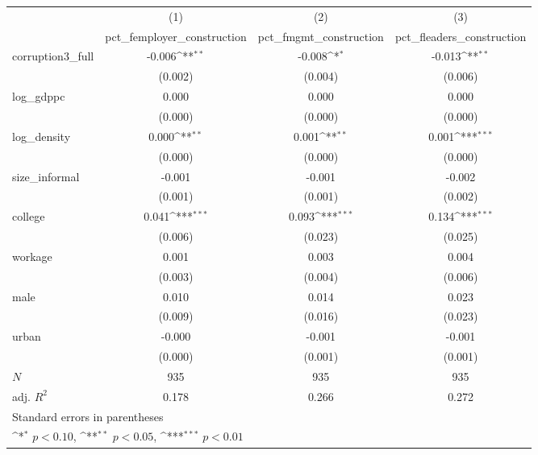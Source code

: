 {
\def\sym#1{\ifmmode^{#1}\else\(^{#1}\)\fi}
\begin{tabular}{l*{3}{c}}
\hline\hline
            &\multicolumn{1}{c}{(1)}&\multicolumn{1}{c}{(2)}&\multicolumn{1}{c}{(3)}\\
            &\multicolumn{1}{c}{pct\_femployer\_construction}&\multicolumn{1}{c}{pct\_fmgmt\_construction}&\multicolumn{1}{c}{pct\_fleaders\_construction}\\
\hline
corruption3\_full&      -0.006\sym{**} &      -0.008\sym{*}  &      -0.013\sym{**} \\
            &     (0.002)         &     (0.004)         &     (0.006)         \\
[1em]
log\_gdppc   &       0.000         &       0.000         &       0.000         \\
            &     (0.000)         &     (0.000)         &     (0.000)         \\
[1em]
log\_density &       0.000\sym{**} &       0.001\sym{**} &       0.001\sym{***}\\
            &     (0.000)         &     (0.000)         &     (0.000)         \\
[1em]
size\_informal&      -0.001         &      -0.001         &      -0.002         \\
            &     (0.001)         &     (0.001)         &     (0.002)         \\
[1em]
college     &       0.041\sym{***}&       0.093\sym{***}&       0.134\sym{***}\\
            &     (0.006)         &     (0.023)         &     (0.025)         \\
[1em]
workage     &       0.001         &       0.003         &       0.004         \\
            &     (0.003)         &     (0.004)         &     (0.006)         \\
[1em]
male        &       0.010         &       0.014         &       0.023         \\
            &     (0.009)         &     (0.016)         &     (0.023)         \\
[1em]
urban       &      -0.000         &      -0.001         &      -0.001         \\
            &     (0.000)         &     (0.001)         &     (0.001)         \\
\hline
\(N\)       &         935         &         935         &         935         \\
adj. \(R^{2}\)&       0.178         &       0.266         &       0.272         \\
\hline\hline
\multicolumn{4}{l}{\footnotesize Standard errors in parentheses}\\
\multicolumn{4}{l}{\footnotesize \sym{*} \(p<0.10\), \sym{**} \(p<0.05\), \sym{***} \(p<0.01\)}\\
\end{tabular}
}
